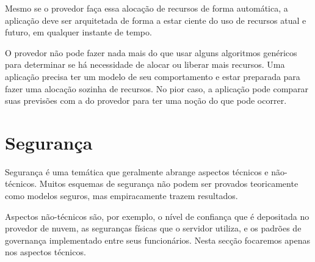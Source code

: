 Mesmo se o provedor faça essa alocação de recursos de forma automática, a aplicação deve ser arquitetada de forma a estar ciente do uso de recursos atual e futuro, em qualquer instante de tempo. 

O provedor não pode fazer nada mais do que usar alguns algoritmos genéricos para determinar se há necessidade de alocar ou liberar mais recursos. Uma aplicação precisa ter um modelo de seu comportamento e estar preparada para fazer uma alocação sozinha de recursos. No pior caso, a aplicação pode comparar suas previsões com a do provedor para ter uma noção do que pode ocorrer.


\section{Segurança}
Segurança é uma temática que geralmente abrange aspectos técnicos e não-técnicos. Muitos esquemas de segurança não podem ser provados teoricamente como modelos seguros, mas empiracamente trazem resultados.

Aspectos não-técnicos são, por exemplo, o nível de confiança que é depositada no provedor de nuvem, as seguranças físicas que o servidor utiliza, e os padrões de governança implementado entre seus funcionários. Nesta secção focaremos apenas nos aspectos técnicos.

\iffalse
Applications in the cloud are accessed over the Internet using standard Internet protocols. 
The security and privacy issues deriving from the use of the Internet are substantial but no different from the security issues faced by applications not hosted in the cloud. The one significant security element introduced by the cloud is multi-tenancy. Multi-tenancy means that your application is utilizing a virtual machine on a physical computer that is hosting multiple virtual machines. If one of the other tenants on your machine is malicious, what damage can they do to you?
\fi

